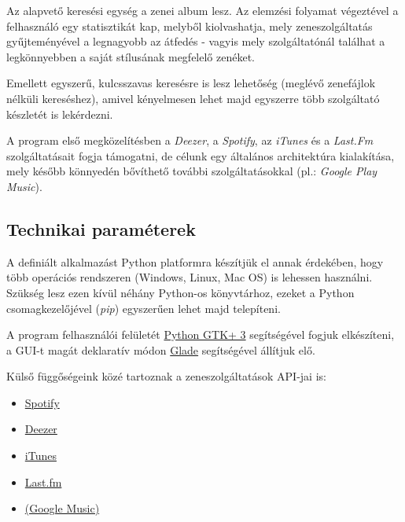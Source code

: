 Az alapvető keresési egység a zenei album lesz. Az elemzési folyamat végeztével a felhasználó egy statisztikát kap, melyből kiolvashatja, mely zeneszolgáltatás gyűjteményével a legnagyobb az átfedés - vagyis mely szolgáltatónál találhat a legkönnyebben a saját stílusának megfelelő zenéket.

Emellett egyszerű, kulcsszavas keresésre is lesz lehetőség (meglévő zenefájlok nélküli kereséshez), amivel kényelmesen lehet majd egyszerre több szolgáltató készletét is lekérdezni.

A program első megközelítésben a \textit{Deezer}, a \textit{Spotify}, az \textit{iTunes} és a \textit{Last.Fm} szolgáltatásait fogja támogatni, de célunk egy általános architektúra kialakítása, mely később könnyedén bővíthető további szolgáltatásokkal (pl.: \textit{Google Play Music}).


\subsection{Technikai paraméterek}
\label{sub:technikaiparameterek}

A definiált alkalmazást Python platformra készítjük el annak érdekében, hogy több operációs rendszeren (Windows, Linux, Mac OS) is lehessen használni.  Szükség lesz ezen kívül néhány Python-os könyvtárhoz, ezeket a Python csomagkezelőjével (\textit{pip}) egyszerűen lehet majd telepíteni.

A program felhasználói felületét \href{http://python-gtk-3-tutorial.readthedocs.org/en/latest/}{Python GTK+ 3} segítségével fogjuk elkészíteni, a GUI-t magát deklaratív módon \href{https://glade.gnome.org/}{Glade} segítségével állítjuk elő.

Külső függőségeink közé tartoznak a zeneszolgáltatások API-jai is:

\begin{itemize}
	\item \href{https://developer.spotify.com/web-api/}{Spotify}
    \item \href{http://developers.deezer.com/api/}{Deezer}
    \item \href{https://www.apple.com/itunes/affiliates/resources/documentation/itunes-store-web-service-search-api.html}{iTunes}
    \item \href{http://www.last.fm/api}{Last.fm}
    \item \href{http://unofficial-google-music-api.readthedocs.org/en/latest/}{(Google Music)}
\end{itemize}

